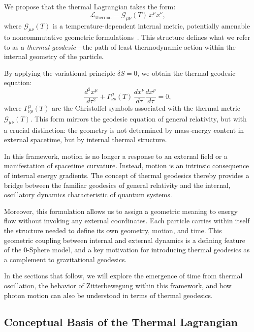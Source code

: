 \documentclass[%
 reprint,
 amsmath,amssymb,
 aps,
]{revtex4-1}
\numberwithin{equation}{section}%
\begin{document}
We propose that the thermal Lagrangian takes the form:
\begin{equation} \label{eq:thermal_lagrangian}
\mathcal{L}_{\text{thermal}} = \mathcal{G}_{\mu\nu}(T) \, \dot{x}^\mu \dot{x}^\nu,
\end{equation}
where $\mathcal{G}_{\mu\nu}(T)$ is a temperature-dependent internal metric, potentially amenable to noncommutative geometric formulations~\cite{connes1994}. This structure defines what we refer to as a \textit{thermal geodesic}---the path of least thermodynamic action within the internal geometry of the particle.

By applying the variational principle $\delta S = 0$, we obtain the thermal geodesic equation:
\begin{equation} \label{eq:thermal_geodesic_eq}
\frac{d^2 x^\mu}{d\tau^2} + \Gamma^\mu_{\nu\rho}(T) \, \frac{dx^\nu}{d\tau} \frac{dx^\rho}{d\tau} = 0,
\end{equation}
where $\Gamma^\mu_{\nu\rho}(T)$ are the Christoffel symbols associated with the thermal metric $\mathcal{G}_{\mu\nu}(T)$. This form mirrors the geodesic equation of general relativity, but with a crucial distinction: the geometry is not determined by mass-energy content in external spacetime, but by internal thermal structure.

In this framework, motion is no longer a response to an external field or a manifestation of spacetime curvature. Instead, motion is an intrinsic consequence of internal energy gradients. The concept of thermal geodesics thereby provides a bridge between the familiar geodesics of general relativity and the internal, oscillatory dynamics characteristic of quantum systems.

Moreover, this formulation allows us to assign a geometric meaning to energy flow without invoking any external coordinates. Each particle carries within itself the structure needed to define its own geometry, motion, and time. This geometric coupling between internal and external dynamics is a defining feature of the 0-Sphere model, and a key motivation for introducing thermal geodesics as a complement to gravitational geodesics.

In the sections that follow, we will explore the emergence of time from thermal oscillation, the behavior of Zitterbewegung within this framework, and how photon motion can also be understood in terms of thermal geodesics.


\subsection{Conceptual Basis of the Thermal Lagrangian}
\label{subsec:conceptual_basis}
\end{document}
